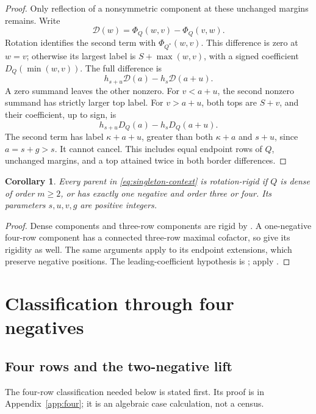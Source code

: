 \documentclass[11pt,a4paper]{amsart}
\numberwithin{equation}{section}
\theoremstyle{plain}
\newtheorem{corollary}[theorem]{Corollary}
\theoremstyle{definition}
\begin{document}
\begin{proof}
Only reflection of a nonsymmetric component at these unchanged margins
remains.  Write
\[
 \mathcal D(w)=\Phi_Q(w,v)-\Phi_Q(v,w).
\]
Rotation identifies the second term with \(\Phi_{Q^*}(w,v)\).
This difference is zero at \(w=v\); otherwise its largest label is
\(S+\max(w,v)\), with a signed coefficient
\(D_Q(\min(w,v))\).  The full difference is
\[
 h_{s+u}\mathcal D(a)-h_s\mathcal D(a+u).
\]
A zero summand leaves the other nonzero.  For \(v<a+u\), the second
nonzero summand has strictly larger top label.  For \(v>a+u\), both tops
are \(S+v\), and their coefficient, up to sign, is
\begin{equation}\label{eq:double-top}
 h_{s+u}D_Q(a)-h_sD_Q(a+u).
\end{equation}
The second term has label \(\kappa+a+u\), greater than both
\(\kappa+a\) and \(s+u\), since \(a=s+g>s\).
It cannot cancel.  This includes equal endpoint rows of \(Q\), unchanged
margins, and a top attained twice in both border differences.
\end{proof}

\begin{corollary}\label{lem:singleton-rigidity}
Every parent in \eqref{eq:singleton-context} is rotation-rigid if \(Q\)
is dense of order \(m\ge2\), or has exactly one negative and order three
or four.  Its parameters \(s,u,v,g\) are positive integers.
\end{corollary}

\begin{proof}
Dense components and three-row components are rigid by
.  A one-negative four-row component has a connected
three-row maximal cofactor, so  give its
rigidity as well.  The same arguments apply to its endpoint extensions,
which preserve negative positions.  The leading-coefficient hypothesis
is ; apply .
\end{proof}

\section{Classification through four negatives}\label{sec:low}

\subsection{Four rows and the two-negative lift}

The four-row classification needed below is stated first.  Its proof is in
Appendix~\ref{app:four}; it is an algebraic case calculation, not a census.
\end{document}

